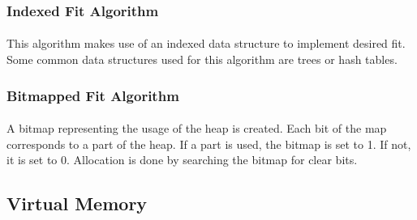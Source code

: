 \subsubsection{Indexed Fit Algorithm}
\paragraph{}
This algorithm makes use of an indexed data structure to implement desired fit.
Some common data structures used for this algorithm are trees or hash tables.

\subsubsection{Bitmapped Fit Algorithm}
\paragraph{}
A bitmap representing the usage of the heap is created.
Each bit of the map corresponds to a part of the heap.
If a part is used, the bitmap is set to 1.
If not, it is set to 0.
Allocation is done by searching the bitmap for clear bits.


\subsection{Virtual Memory}
